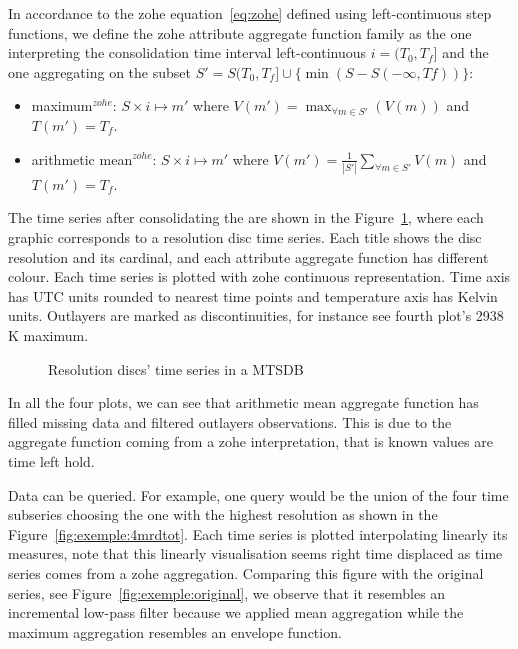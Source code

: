 In accordance to the zohe equation~\ref{eq:zohe} defined using
left-continuous step functions, we define the zohe attribute aggregate
function family as the one interpreting the consolidation time
interval left-continuous $i=(T_0,T_f]$ and the one aggregating on the
subset $S'=S(T_0,T_f] \cup \{\min(S-S(-\infty,Tf))\}$:
\begin{itemize}
  \renewcommand{\labelitemi}{--}
\item maximum$^{zohe}$: $S \times i \mapsto m'$ where $V(m') =
  \max_{\forall m \in S'}(V(m))$ and $T(m')=T_f$.
\item arithmetic mean$^{zohe}$: $S \times i \mapsto m'$ where $V(m')
  = \frac{1}{|S'|} \sum\limits_{\forall m\in S'} V(m)$ and
  $T(m')=T_f$. 
\end{itemize}


The time series after consolidating the  are shown in the
Figure~\ref{fig:exemple:4mrd}, where each graphic corresponds to a
resolution disc time series. Each title shows the disc resolution and
its cardinal, and each attribute aggregate function has different
colour.  Each time series is plotted with zohe continuous
representation. Time axis has UTC units rounded to nearest time points
and temperature axis has Kelvin units. Outlayers are marked as
discontinuities, for instance see fourth plot's 2938 K maximum.

\begin{figure}[tp]
  \centering
  
  \caption{Resolution discs' time series in a MTSDB}
  \label{fig:exemple:4mrd}
\end{figure}

In all the four plots, we can see that arithmetic mean aggregate
function has filled missing data and filtered outlayers
observations. This is due to the aggregate function coming from a zohe
interpretation, that is known values are time left hold.

Data can be queried.  For example, one query would be the union of the
four time subseries choosing the one with the highest resolution as
shown in the Figure~\ref{fig:exemple:4mrdtot}.  Each time series is
plotted interpolating linearly its measures, note that this linearly
visualisation seems right time displaced as time series comes from a
zohe aggregation.  Comparing this figure with the original series, see
Figure~\ref{fig:exemple:original}, we observe that it resembles an
incremental low-pass filter because we applied mean aggregation while
the maximum aggregation resembles an envelope function.

